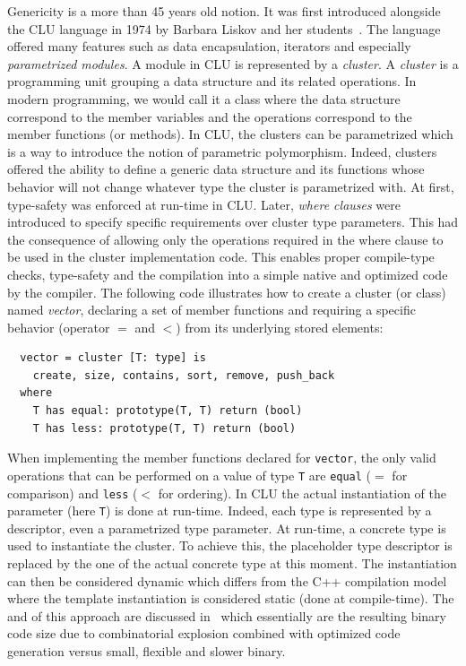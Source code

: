 Genericity is a more than 45 years old notion. It was first introduced alongside the CLU language in 1974 by Barbara
Liskov and her students~\parencite{liskov.1993.cluart}. The language offered many features such as data encapsulation,
iterators and especially \emph{parametrized modules}. A module in CLU is represented by a \emph{cluster}. A
\emph{cluster} is a programming unit grouping a data structure and its related operations. In modern programming, we
would call it a class where the data structure correspond to the member variables and the operations correspond to the
member functions (or methods). In CLU, the clusters can be parametrized which is a way to introduce the notion of
parametric polymorphism. Indeed, clusters offered the ability to define a generic data structure and its functions whose
behavior will not change whatever type the cluster is parametrized with. At first, type-safety was enforced at run-time
in CLU. Later, \emph{where clauses} were introduced to specify specific requirements over cluster type parameters. This
had the consequence of allowing only the operations required in the where clause to be used in the cluster
implementation code. This enables proper compile-type checks, type-safety and the compilation into a simple native and
optimized code by the compiler. The following code illustrates how to create a cluster (or class) named \emph{vector},
declaring a set of member functions and requiring a specific behavior (operator \(=\) and \(<\)) from its underlying stored
elements:

\begin{verbatim}
  vector = cluster [T: type] is
    create, size, contains, sort, remove, push_back
  where
    T has equal: prototype(T, T) return (bool)
    T has less: prototype(T, T) return (bool)
\end{verbatim}

When implementing the member functions declared for \texttt{vector}, the only valid operations that can be performed on
a value of type \texttt{T} are \texttt{equal} (\(=\) for comparison) and \texttt{less} (\(<\) for ordering). In CLU the
actual instantiation of the parameter (here \texttt{T}) is done at run-time. Indeed, each type is represented by a
descriptor, even a parametrized type parameter. At run-time, a concrete type is used to instantiate the cluster. To
achieve this, the placeholder type descriptor is replaced by the one of the actual concrete type at this moment. The
instantiation can then be considered dynamic which differs from the C++ compilation model where the template
instantiation is considered static (\ie done at compile-time). The \pros and \cons of this approach are discussed
in~\parencite{atkinson.1978.cluimpl} which essentially are the resulting binary code size due to combinatorial explosion
combined with optimized code generation versus small, flexible and slower binary.

